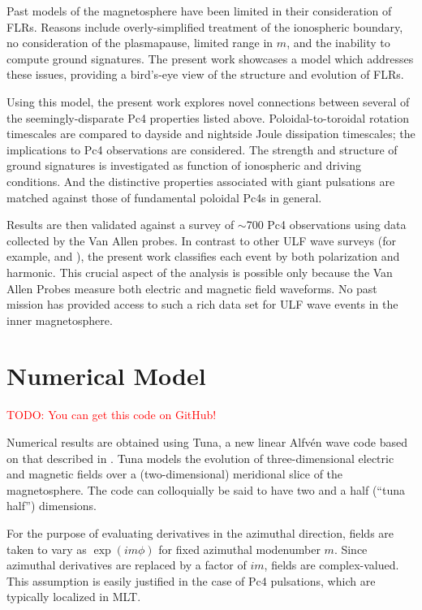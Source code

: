 \documentclass{article}
\newcommand{\about}{\ensuremath{\sim}}
\newcommand{\todo}[1]{ \textcolor{red}{TODO: #1} }
\newcommand{\Alfven}{Alfv\'en\xspace}
\newcommand{\lr}[1]{ \left( #1 \right) }
\renewcommand{\arg}[1]{\!\lr{#1}}
\newcommand{\azm}{\ensuremath{m}\xspace}
\begin{document}
Past models of the magnetosphere have been limited in their consideration of FLRs. Reasons include overly-simplified treatment of the ionospheric boundary, no consideration of the plasmapause, limited range in \azm, and the inability to compute ground signatures. The present work showcases a model which addresses these issues, providing a bird’s-eye view of the structure and evolution of FLRs.

Using this model, the present work explores novel connections between several of the seemingly-disparate Pc4 properties listed above. Poloidal-to-toroidal rotation timescales are compared to dayside and nightside Joule dissipation timescales; the implications to Pc4 observations are considered. The strength and structure of ground signatures is investigated as function of ionospheric and driving conditions. And the distinctive properties associated with giant pulsations are matched against those of fundamental poloidal Pc4s in general.

Results are then validated against a survey of \about700 Pc4 observations using data collected by the Van Allen probes. In contrast to other ULF wave surveys (for example, \cite{dai_2015} and \cite{motoba_2015}), the present work classifies each event by both polarization and harmonic. This crucial aspect of the analysis is possible only because the Van Allen Probes measure both electric and magnetic field waveforms. No past mission has provided access to such a rich data set for ULF wave events in the inner magnetosphere.


\section{Numerical Model}

\todo{You can get this code on GitHub!}

Numerical results are obtained using Tuna, a new linear \Alfven wave code based on that described in \cite{lysak_2013}. Tuna models the evolution of three-dimensional electric and magnetic fields over a (two-dimensional) meridional slice of the magnetosphere. The code can colloquially be said to have two and a half (``tuna half'') dimensions.

For the purpose of evaluating derivatives in the azimuthal direction, fields are taken to vary as $\exp \arg{i \azm \phi}$ for fixed azimuthal modenumber \azm. Since azimuthal derivatives are replaced by a factor of $i \azm$, fields are complex-valued. This assumption is easily justified in the case of Pc4 pulsations, which are typically localized in MLT\cite{anderson_1990,dai_2015,engebretson_1992,liu_2009}.
\end{document}
